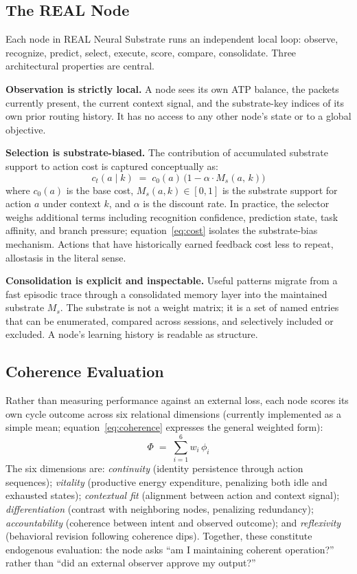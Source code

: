 \documentclass[letterpaper]{article}
\begin{document}
\subsection{The REAL Node}

Each node in REAL Neural Substrate runs an independent local loop: observe,
recognize, predict, select, execute, score, compare, consolidate. Three
architectural properties are central.

\textbf{Observation is strictly local.} A node sees its own ATP balance, the
packets currently present, the current context signal, and the substrate-key
indices of its own prior routing history. It has no access to any other node's
state or to a global objective.

\textbf{Selection is substrate-biased.} The contribution of accumulated substrate
support to action cost is captured conceptually as:
\begin{equation}
  c_t(a \mid k) \;=\; c_0(a)\,\bigl(1 - \alpha \cdot M_s(a,\, k)\bigr)
  \label{eq:cost}
\end{equation}
where $c_0(a)$ is the base cost, $M_s(a,k) \in [0,1]$ is the substrate support
for action $a$ under context $k$, and $\alpha$ is the discount rate. In practice,
the selector weighs additional terms including recognition confidence, prediction
state, task affinity, and branch pressure; equation~\ref{eq:cost} isolates the
substrate-bias mechanism. Actions that have historically earned feedback cost less
to repeat, allostasis in the literal sense.

\textbf{Consolidation is explicit and inspectable.} Useful patterns migrate from a
fast episodic trace through a consolidated memory layer into the maintained
substrate $M_s$. The substrate is not a weight matrix; it is a set of named
entries that can be enumerated, compared across sessions, and selectively included
or excluded. A node's learning history is readable as structure.

\subsection{Coherence Evaluation}

Rather than measuring performance against an external loss, each node scores its
own cycle outcome across six relational dimensions (currently implemented as a
simple mean; equation~\ref{eq:coherence} expresses the general weighted form):
\begin{equation}
  \Phi \;=\; \sum_{i=1}^{6} w_i\, \phi_i
  \label{eq:coherence}
\end{equation}
The six dimensions are: \textit{continuity} (identity persistence through action
sequences); \textit{vitality} (productive energy expenditure, penalizing both idle
and exhausted states); \textit{contextual fit} (alignment between action and
context signal); \textit{differentiation} (contrast with neighboring nodes,
penalizing redundancy); \textit{accountability} (coherence between intent and
observed outcome); and \textit{reflexivity} (behavioral revision following
coherence dips). Together, these constitute endogenous evaluation: the node asks
``am I maintaining coherent operation?'' rather than ``did an external observer
approve my output?''
\end{document}
